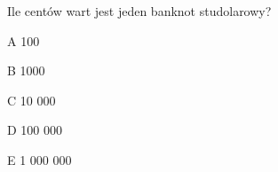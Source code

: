 \begin{tresc}
Ile centów wart jest jeden banknot studolarowy?
\end{tresc}
\begin{wariant}{A} 100 \end{wariant}
\begin{wariant}{B} 1000 \end{wariant}
\begin{wariant}{C} 10 000 \end{wariant}
\begin{wariant}{D} 100 000 \end{wariant}
\begin{wariant}{E} 1 000 000 \end{wariant}
